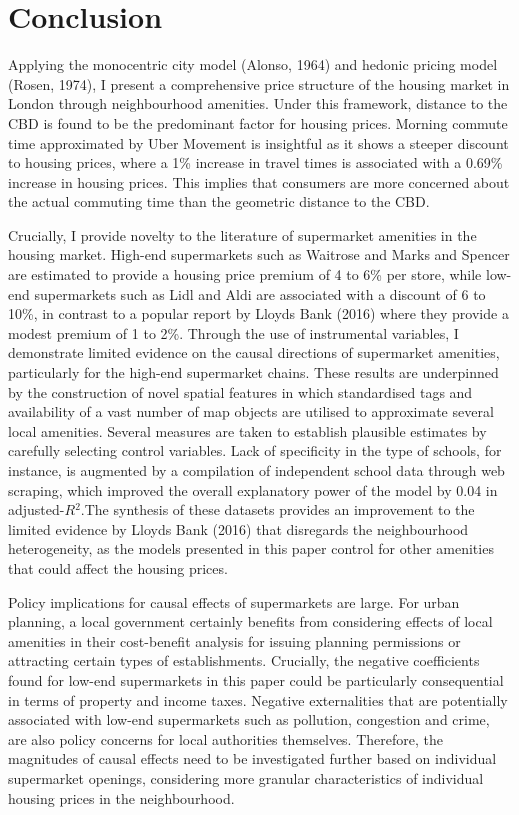 \documentclass{article}
\begin{document}
\section{Conclusion} \label{section:conclusion}
Applying the monocentric city model (Alonso, 1964) and hedonic pricing model (Rosen, 1974), I present a comprehensive price structure of the housing market in London through neighbourhood amenities. Under this framework, distance to the CBD is found to be the predominant factor for housing prices. Morning commute time approximated by Uber Movement is insightful as it shows a steeper discount to housing prices, where a 1\% increase in travel times is associated with a 0.69\% increase in housing prices. This implies that consumers are more concerned about the actual commuting time than the geometric distance to the CBD.

Crucially, I provide novelty to the literature of supermarket amenities in the housing market. High-end supermarkets such as Waitrose and Marks and Spencer are estimated to provide a housing price premium of 4 to 6\% per store, while low-end supermarkets such as Lidl and Aldi are associated with a discount of 6 to 10\%, in contrast to a popular report by Lloyds Bank (2016) where they provide a modest premium of 1 to 2\%. Through the use of instrumental variables, I demonstrate limited evidence on the causal directions of supermarket amenities, particularly for the high-end supermarket chains. These results are underpinned by the construction of novel spatial features in which standardised tags and availability of a vast number of map objects are utilised to approximate several local amenities. Several measures are taken to establish plausible estimates by carefully selecting control variables. Lack of specificity in the type of schools, for instance, is augmented by a compilation of independent school data through web scraping, which improved the overall explanatory power of the model by 0.04 in adjusted-$R{^2}$.The synthesis of these datasets provides an improvement to the limited evidence by Lloyds Bank (2016) that disregards the neighbourhood heterogeneity, as the models presented in this paper control for other amenities that could affect the housing prices.

Policy implications for causal effects of supermarkets are large. For urban planning, a local government certainly benefits from considering effects of local amenities in their cost-benefit analysis for issuing planning permissions or attracting certain types of establishments. Crucially, the negative coefficients found for low-end supermarkets in this paper could be particularly consequential in terms of property and income taxes. Negative externalities that are potentially associated with low-end supermarkets such as pollution, congestion and crime, are also policy concerns for local authorities themselves. Therefore, the magnitudes of causal effects need to be investigated further based on individual supermarket openings, considering more granular characteristics of individual housing prices in the neighbourhood.
\end{document}
